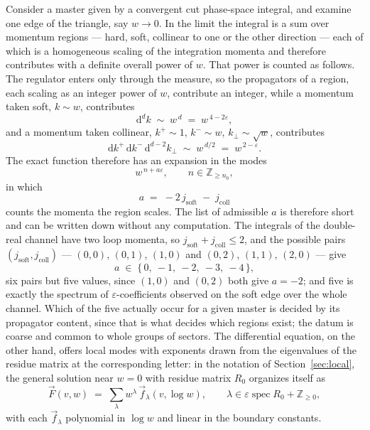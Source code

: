 \documentclass[11pt]{article}
\newcommand{\eps}{\varepsilon}
\newcommand{\dd}{\mathrm{d}}
\newcommand{\Z}{\mathbb{Z}}
\begin{document}
Consider a master given by a convergent cut phase-space integral,
and examine one edge of the triangle, say $w \to 0$.  In the limit
the integral is a sum over momentum regions --- hard, soft,
collinear to one or the other direction --- each of which is a
homogeneous scaling of the integration momenta and therefore
contributes with a definite overall power of $w$.  That power is
counted as follows.  The regulator enters only through the measure,
so the propagators of a region, each scaling as an integer power of
$w$, contribute an integer, while a momentum taken soft,
$k \sim w$, contributes
\begin{equation}
  \dd^d k \;\sim\; w^{\,d} \;=\; w^{\,4-2\eps} ,
\end{equation}
and a momentum taken collinear, $k^+ \sim 1$, $k^- \sim w$,
$k_\perp \sim \sqrt w$, contributes
\begin{equation}
  \dd k^+\,\dd k^-\,\dd^{d-2}k_\perp
  \;\sim\; w^{\,d/2} \;=\; w^{\,2-\eps} .
\end{equation}
The exact function therefore has an expansion in the modes
\begin{equation}
  w^{\,n + a\eps},
  \qquad n \in \Z_{\ge n_0} ,
\end{equation}
in which
\begin{equation}
  a \;=\; -2\,j_{\text{soft}} \;-\; j_{\text{coll}}
  \label{eq:regionexponent}
\end{equation}
counts the momenta the region scales.  The list of admissible $a$ is
therefore short and can be written down without any computation.  The
integrals of the double-real channel have two loop momenta, so
$j_{\text{soft}} + j_{\text{coll}} \le 2$, and the possible pairs
$(j_{\text{soft}}, j_{\text{coll}})$ --- $(0,0)$, $(0,1)$, $(1,0)$
and $(0,2)$, $(1,1)$, $(2,0)$ --- give
\begin{equation}
  a \;\in\; \{\,0,\ -1,\ -2,\ -3,\ -4\,\} ,
\end{equation}
six pairs but five values, since $(1,0)$ and $(0,2)$ both give
$a = -2$; and five is exactly the spectrum of $\eps$-coefficients
observed on the soft edge over the whole channel.  Which of the five
actually occur for a given master is decided by its propagator
content, since that is what decides which regions exist; the datum is
coarse and common to whole groups of sectors.  The differential
equation, on the other hand, offers local modes with exponents drawn
from the eigenvalues of the residue matrix at the corresponding
letter: in the notation of Section~\ref{sec:local}, the general
solution near $w = 0$ with residue matrix $R_0$ organizes itself as
\begin{equation}
  \vec F(v,w) \;=\; \sum_{\lambda}
  w^{\lambda}\, \vec f_{\lambda}(v, \log w) ,
  \qquad
  \lambda \in \eps\operatorname{spec} R_0 + \Z_{\ge 0} ,
  \label{eq:localmodes}
\end{equation}
with each $\vec f_\lambda$ polynomial in $\log w$ and linear in the
boundary constants.
\end{document}
